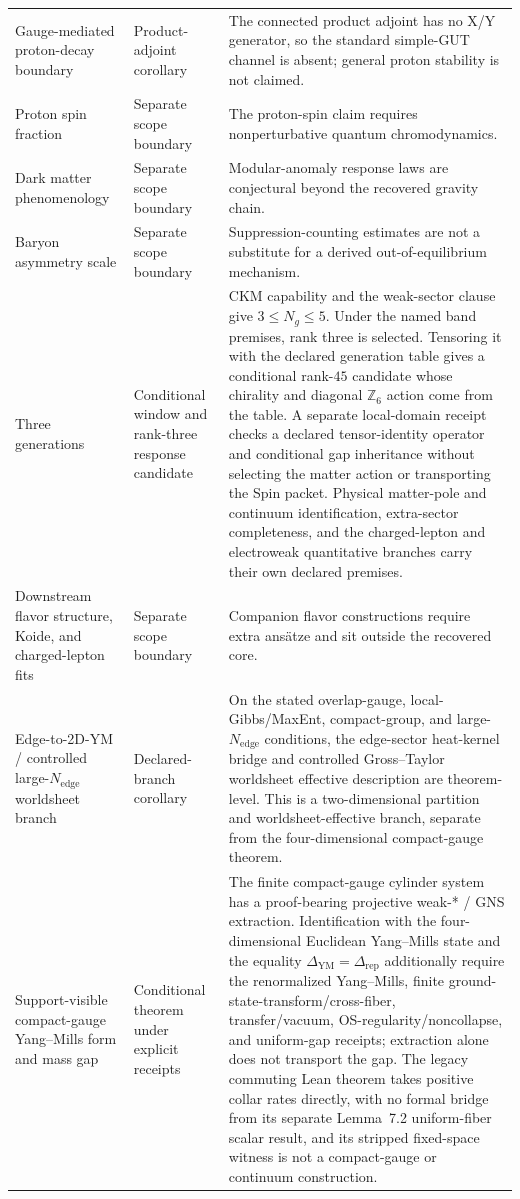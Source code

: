 \begin{longtable}{@{}>{\raggedright\arraybackslash}p{}>{\raggedright\arraybackslash}p{}>{\raggedright\arraybackslash}p{}@{}}
Gauge-mediated proton-decay boundary & Product-adjoint corollary & The connected product adjoint has no X/Y generator, so the standard simple-GUT channel is absent; general proton stability is not claimed. \\
Proton spin fraction & Separate scope boundary & The proton-spin claim requires nonperturbative quantum chromodynamics. \\
Dark matter phenomenology & Separate scope boundary & Modular-anomaly response laws are conjectural beyond the recovered gravity chain. \\
Baryon asymmetry scale & Separate scope boundary & Suppression-counting estimates are not a substitute for a derived out-of-equilibrium mechanism. \\
Three generations & Conditional window and rank-three response candidate & CKM capability and the weak-sector clause give \(3\le N_g\le5\). Under the named band premises, rank three is selected. Tensoring it with the declared generation table gives a conditional rank-\(45\) candidate whose chirality and diagonal \(\mathbb Z_6\) action come from the table. A separate local-domain receipt checks a declared tensor-identity operator and conditional gap inheritance without selecting the matter action or transporting the Spin packet. Physical matter-pole and continuum identification, extra-sector completeness, and the charged-lepton and electroweak quantitative branches carry their own declared premises. \\
Downstream flavor structure, Koide, and charged-lepton fits & Separate scope boundary & Companion flavor constructions require extra ans\"atze and sit outside the recovered core. \\
Edge-to-2D-YM / controlled large-\(N_{\mathrm{edge}}\) worldsheet branch & Declared-branch corollary & On the stated overlap-gauge, local-Gibbs/MaxEnt, compact-group, and large-\(N_{\mathrm{edge}}\) conditions, the edge-sector heat-kernel bridge and controlled Gross--Taylor worldsheet effective description are theorem-level. This is a two-dimensional partition and worldsheet-effective branch, separate from the four-dimensional compact-gauge theorem. \\
Support-visible compact-gauge Yang--Mills form and mass gap & Conditional theorem under explicit receipts & The finite compact-gauge cylinder system has a proof-bearing projective weak-* / GNS extraction. Identification with the four-dimensional Euclidean Yang--Mills state and the equality \(\Delta_{\mathrm{YM}}=\Delta_{\mathrm{rep}}\) additionally require the renormalized Yang--Mills, finite ground-state-transform/cross-fiber, transfer/vacuum, OS-regularity/noncollapse, and uniform-gap receipts; extraction alone does not transport the gap. The legacy commuting Lean theorem takes positive collar rates directly, with no formal bridge from its separate Lemma~7.2 uniform-fiber scalar result, and its stripped fixed-space witness is not a compact-gauge or continuum construction. \\

\end{longtable}
